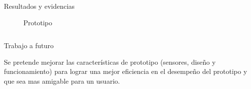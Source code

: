 \documentclass{beamer}
\begin{document}
\begin{frame}[fragile]{}
\begin{columns}[t]
\begin{column}{0.46\linewidth}
\begin{block}{Resultados y evidencias}
\begin{figure}[H]
	 		\caption{Prototipo}
	 	\end{figure}
	 	

	 	 
	 	\end{block}
	 \end{column}
	\end{columns}
 
 	\justifying
 	\begin{columns}[t]
 
  
  \begin{column}{0.46\linewidth}
  	\begin{block}{Trabajo a futuro}
  		\begin{minipage}[t]{1\textwidth}
  			\vspace{0pt}
 Se pretende mejorar las características de prototipo (sensores, diseño y funcionamiento) para lograr una mejor eficiencia en el desempeño del prototipo y que sea mas amigable para un usuario.
  		\end{minipage} 
  	\end{block}
  \end{column}


\end{columns}
\end{frame}
\end{document}

